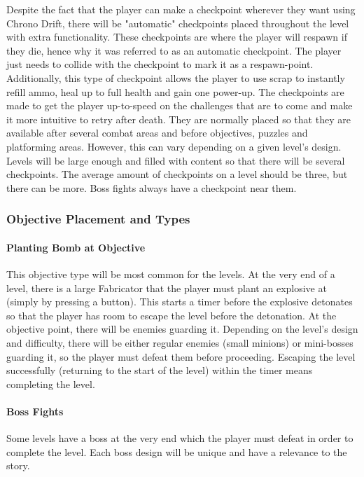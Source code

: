 \documentclass[12pt]{article}
\begin{document}
Despite the fact that the player can make a checkpoint wherever they want using Chrono Drift, there will be "automatic" checkpoints placed throughout the level with extra functionality. These checkpoints are where the player will respawn if they die, hence why it was referred to as an automatic checkpoint. The player just needs to collide with the checkpoint to mark it as a respawn-point. Additionally, this type of checkpoint allows the player to use scrap to instantly refill ammo, heal up to full health and gain one power-up. The checkpoints are made to get the player up-to-speed on the challenges that are to come and make it more intuitive to retry after death. They are normally placed so that they are available after several combat areas and before objectives, puzzles and platforming areas. However, this can vary depending on a given level's design. Levels will be large enough and filled with content so that there will be several checkpoints. The average amount of checkpoints on a level should be three, but there can be more. Boss fights always have a checkpoint near them. 

\subsubsection{Objective Placement and Types}

\paragraph{Planting Bomb at Objective}

This objective type will be most common for the levels. At the very end of a level, there is a large Fabricator that the player must plant an explosive at (simply by pressing a button). This starts a timer before the explosive detonates so that the player has room to escape the level before the detonation. At the objective point, there will be enemies guarding it. Depending on the level's design and difficulty, there will be either regular enemies (small minions) or mini-bosses guarding it, so the player must defeat them before proceeding. Escaping the level successfully (returning to the start of the level) within the timer means completing the level. 

\paragraph{Boss Fights}

Some levels have a boss at the very end which the player must defeat in order to complete the level. Each boss design will be unique and have a relevance to the story. 
\end{document}
